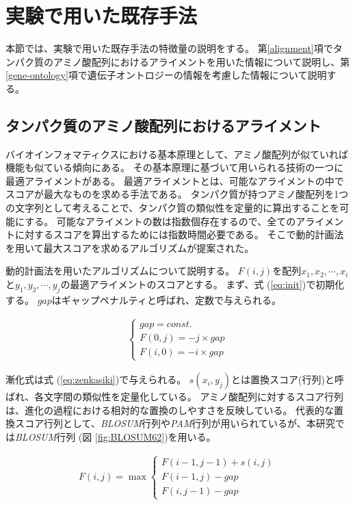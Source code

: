 \documentclass[titlepage,12pt]{jreport}
\begin{document}
\section{実験で用いた既存手法\label{used-method}}
本節では、実験で用いた既存手法の特徴量の説明をする。 第\ref{alignment}項でタンパク質のアミノ酸配列におけるアライメントを用いた情報について説明し、第\ref{gene-ontology}項で遺伝子オントロジーの情報を考慮した情報について説明する。
\subsection{タンパク質のアミノ酸配列におけるアライメント\label{alignment}}
バイオインフォマティクスにおける基本原理として、アミノ酸配列が似ていれば機能も似ている傾向にある。 その基本原理に基づいて用いられる技術の一つに最適アライメントがある。 最適アライメントとは、可能なアライメントの中でスコアが最大なものを求める手法である。 タンパク質が持つアミノ酸配列を1つの文字列として考えることで、タンパク質の類似性を定量的に算出することを可能にする。 可能なアライメントの数は指数個存在するので、全てのアライメントに対するスコアを算出するためには指数時間必要である。 そこで動的計画法を用いて最大スコアを求めるアルゴリズムが提案された。

動的計画法を用いたアルゴリズムについて説明する。
$F(i, j)$を配列$x_1, x_2, \cdots, x_i$と$y_1, y_2, \cdots, y_j$の最適アライメントのスコアとする。 まず、式 (\ref{eq:init})で初期化する。 $gap$はギャップペナルティと呼ばれ、定数で与えられる。

\begin{eqnarray}
	\begin{cases}
		gap = const. \\
		F(0, j) = -j \times gap \\
		F(i, 0) = -i \times gap
	\end{cases}
	\label{eq:init}
\end{eqnarray}

漸化式は式 (\ref{eq:zenkasiki})で与えられる。 $s(x_i, y_j)$とは置換スコア(行列)と呼ばれ、各文字間の類似性を定量化している。 アミノ酸配列に対するスコア行列は、進化の過程における相対的な置換のしやすさを反映している。 代表的な置換スコア行列として、{\it BLOSUM}行列や{\it PAM}行列が用いられているが、本研究では{\it BLOSUM}行列 (図 \ref{fig:BLOSUM62})を用いる。

\begin{eqnarray}
	F(i, j) = \max
	\begin{cases}
		F(i - 1, j - 1) + s(i, j) \\
		F(i - 1, j) - gap \\
		F(i, j - 1) - gap
	\end{cases}
	\label{eq:zenkasiki}
\end{eqnarray}
\end{document}
